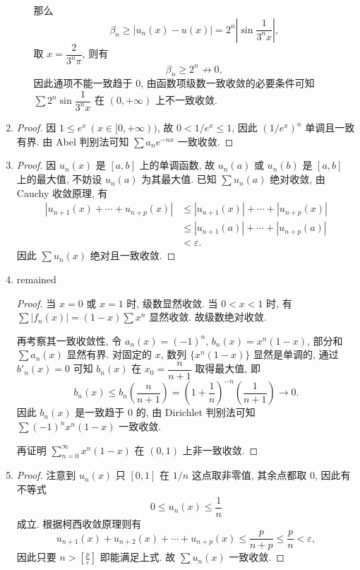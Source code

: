 \begin{enumerate}
\begin{enumerate}[(1)]
\[                \]
                那么
                \[
                    \beta_n \geq |u_n(x) - u(x)| = 2^n\left|\sin\frac{1}{3^nx}\right|,    
                \]
                取 $x = \dfrac{2}{3^n\pi}$, 则有
                \[
                    \beta_n \geq 2^n \not\to 0,    
                \]
                因此通项不能一致趋于 $0$, 由函数项级数一致收敛的必要条件可知 $\sum{2^n\sin\dfrac{1}{3^nx}}$ 在 $(0, +\infty)$ 上不一致收敛.
        \end{enumerate}
    \item %
        \begin{proof}
            因 $1 \leq e^x\ (x \in [0, +\infty))$, 故 $0 < 1/e^x \leq 1$, 因此 $(1/e^x)^n$ 单调且一致有界.
            由 Abel 判别法可知 $\sum{a_ne^{-nx}}$ 一致收敛.
        \end{proof}
    \item %
        \begin{proof}
            因 $u_n(x)$ 是 $[a, b]$ 上的单调函数, 故 $u_n(a)$ 或 $u_n(b)$ 是 $[a, b]$ 上的最大值, 不妨设 $u_n(a)$ 为其最大值.
            已知 $\sum{u_n(a)}$ 绝对收敛, 由 Cauchy 收敛原理, 有
            \begin{align*}
                |u_{n+1}(x) + \cdots + u_{n+p}(x)| &\leq |u_{n+1}(x)| + \cdots + |u_{n+p}(x)| \\
                &\leq |u_{n+1}(a)| + \cdots + |u_{n+p}(a)| \\
                &< \varepsilon.
            \end{align*}
            因此 $\sum{u_n(x)}$ 绝对且一致收敛.
        \end{proof}
    \item %
        {\color{red}remained}
        \begin{proof}
            当 $x=0$ 或 $x=1$ 时, 级数显然收敛. 当 $0 < x < 1$ 时, 有 $\sum|f_n(x)| = (1-x)\sum{x^n}$ 显然收敛.
            故级数绝对收敛.
            
            再考察其一致收敛性, 令 $a_n(x) = (-1)^n$, $b_n(x) = x^n(1-x)$, 部分和 $\sum a_n(x)$ 显然有界. 对固定的 $x$, 数列 $\{x^n(1-x)\}$ 显然是单调的,
            通过 $b'_n(x) = 0$ 可知 $b_n(x)$ 在 $x_0 = \dfrac{n}{n+1}$ 取得最大值, 即
            \[
                b_n(x) \leq b_n\left(\frac{n}{n+1}\right) = \left(1+\frac1n\right)^{-n}\left(\frac{1}{n+1}\right) \to 0.    
            \]
            因此 $b_n(x)$ 是一致趋于 $0$ 的, 由 Dirichlet 判别法可知 $\sum(-1)^nx^n(1-x)$ 一致收敛.

            再证明 $\sum\limits_{n=0}^\infty x^n(1-x)$ 在 $(0, 1)$ 上非一致收敛.
        \end{proof}
    \item %
        \begin{proof}
            注意到 $u_n(x)$ 只 $[0, 1]$ 在 $1/n$ 这点取非零值, 其余点都取 $0$, 因此有不等式
            \[
                0 \leq u_n(x) \leq \frac1n    
            \]
            成立. 根据柯西收敛原理则有
            \[
                u_{n+1}(x) + u_{n+2}(x) + \cdots + u_{n+p}(x) \leq \frac{p}{n+p} \leq \frac{p}{n} < \varepsilon,   
            \]
            因此只要 $n > \left[\frac{p}{\varepsilon}\right]$ 即能满足上式. 故 $\sum{u_n(x)}$ 一致收敛.


\end{proof}
\end{enumerate}
